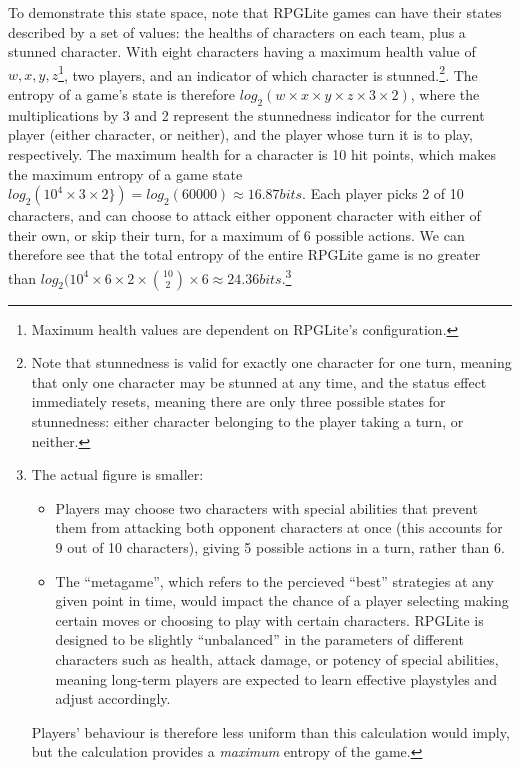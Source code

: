 To demonstrate this state space, note that RPGLite games can have their states
described by a set of values: the healths of characters on each team, plus a
stunned character. With eight characters having a maximum health value of $w, x,
y, z$\footnote{Maximum health values are dependent on RPGLite's configuration.},
two players, and an indicator of which character is stunned.\footnote{Note that stunnedness is valid for exactly one
character for one turn, meaning that only one character may be stunned at any
time, and the status effect immediately resets, meaning there are only three possible states for stunnedness: either character belonging to the player taking a turn, or neither.}. The
entropy of a game's state is therefore \(log_2(w\times{}x\times{}y\times{}z\times{}3\times{}2)\), where the multiplications by 3 and 2 represent the stunnedness indicator for the current player (either character, or neither), and the player whose turn it is to play, respectively. The maximum health for a character is 10 hit points, which makes the maximum entropy of a game state
 \(log_2(10^{4}\times{}3\times{}2\}) = log_2(60000) \approx 16.87 bits\). Each player picks 2 of 10 characters, and can choose to attack either opponent character with either of their own, or skip their turn, for a maximum of 6 possible actions. We can therefore see that the total entropy of the entire RPGLite game is no greater than \(log_2(10^{4}\times{}6\times{}2\times{}{10\choose2}\times{}6 \approx 24.36 bits\).\footnote{The actual figure is smaller: \begin{itemize}\item Players may choose two characters with special abilities that prevent them from attacking both opponent characters at once (this accounts for 9 out of 10 characters), giving 5 possible actions in a turn, rather than 6.\item The ``metagame'', which refers to the percieved ``best'' strategies at any given point in time, would impact the chance of a player selecting making certain moves or choosing to play with certain characters. RPGLite is designed to be slightly ``unbalanced'' in the parameters of different characters such as health, attack damage, or potency of special abilities, meaning long-term players are expected to learn effective playstyles and adjust accordingly.\end{itemize}\par{}\indent{}Players' behaviour is therefore less uniform than this calculation would imply, but the calculation provides a \emph{maximum} entropy of the game.}

